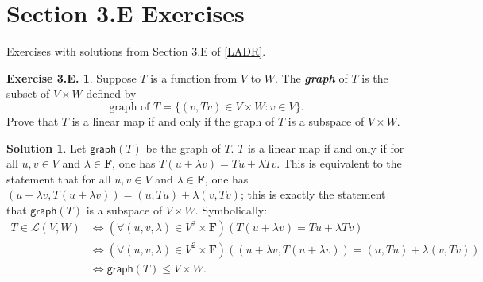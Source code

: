 \documentclass[12pt]{article}
\theoremstyle{definition}
\theoremstyle{exercise}
\newtheorem{exercise}{Exercise 3.E.}
\theoremstyle{solution}
\newtheorem*{solution}{Solution}
\newcommand{\lmap}{\mathcal{L}}
\newcommand{\F}{\mathbf{F}}
\begin{document}
\section{Section 3.E Exercises}

Exercises with solutions from Section 3.E of \hyperlink{ladr}{[LADR]}.

\begin{exercise}
\label{ex:1}
    Suppose \( T \) is a function from \( V \) to \( W \). The \textit{\textbf{graph}} of \( T \) is the subset of \( V \times W \) defined by
    \[
        \text{graph of } T = \{ (v, Tv) \in V \times W : v \in V \}.
    \]
    Prove that \( T \) is a linear map if and only if the graph of \( T \) is a subspace of \( V \times W \).

    \vspace{2mm}

\end{exercise}

\begin{solution}
    Let \( \mathsf{graph}(T) \) be the graph of \( T \). \( T \) is a linear map if and only if for all \( u, v \in V \) and \( \lambda \in \F \), one has \( T(u + \lambda v) = Tu + \lambda Tv \). This is equivalent to the statement that for all \( u, v \in V \) and \( \lambda \in \F \), one has \( (u + \lambda v, T(u + \lambda v)) = (u, Tu) + \lambda (v, Tv) \); this is exactly the statement that \( \mathsf{graph}(T) \) is a subspace of \( V \times W \). Symbolically:
    \begin{align*}
        T \in \lmap(V, W) &\iff (\forall (u, v, \lambda) \in V^2 \times \F)(T(u + \lambda v) = Tu + \lambda Tv) \\
        &\iff (\forall (u, v, \lambda) \in V^2 \times \F)((u + \lambda v, T(u + \lambda v)) = (u, Tu) + \lambda (v, Tv)) \\
        &\iff \mathsf{graph}(T) \leq V \times W.
    \end{align*}
\end{solution}
\end{document}
